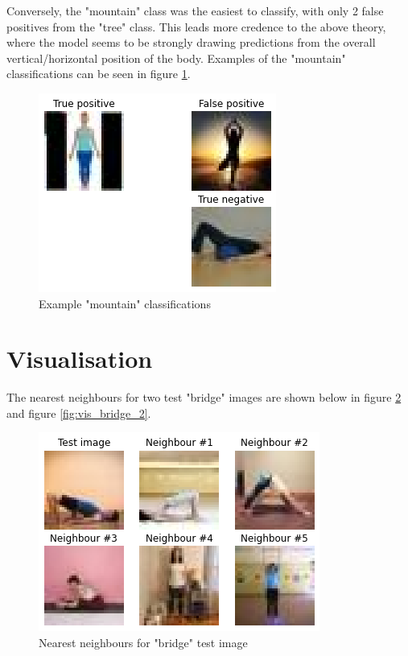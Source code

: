 \documentclass[10pt,a4paper]{article}
\begin{document}
Conversely, the "mountain" class was the easiest to classify, with only 2 false positives from the "tree" class. This leads more credence to the above theory, where the model seems to be strongly drawing predictions from the overall vertical/horizontal position of the body. Examples of the "mountain" classifications can be seen in figure \ref{fig:mountain}.

\begin{figure}[H]
	\centering
	\includegraphics[width=0.7\linewidth]{images/mountain}
	\caption{Example "mountain" classifications}
	\label{fig:mountain}
\end{figure}

\newpage
\section{Visualisation}
The nearest neighbours for two test "bridge" images are shown below in figure \ref{fig:vis_bridge} and figure \ref{fig:vis_bridge_2}.

\begin{figure}[H]
	\centering
	\includegraphics[width=0.7\linewidth]{images/vis_bridge}
	\caption{Nearest neighbours for "bridge" test image}
	\label{fig:vis_bridge}
\end{figure}
\end{document}
